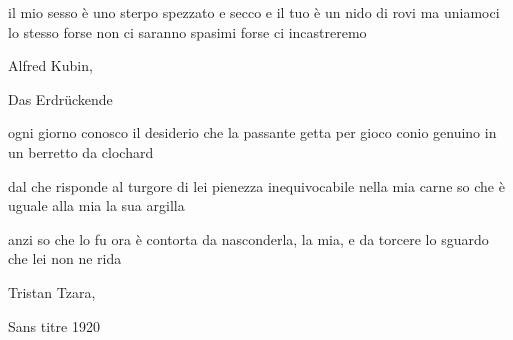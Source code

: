\begin{poem}
	\begin{stanza}
		il mio sesso è uno sterpo\verseline
		spezzato e secco\verseline
		e il tuo è un nido di rovi\verseline
		ma uniamoci lo stesso\verseline
		forse non ci saranno spasimi\verseline
		forse ci incastreremo
	\end{stanza}
\end{poem}

\clearpage


\begin{artItem}
	Alfred Kubin, \begin{otherlanguage}{german}%
		Das Erdrückende%
	\end{otherlanguage}
\end{artItem}

\begin{poem}
	\begin{stanza}
		ogni giorno conosco il desiderio\verseline
		che la passante getta per gioco\verseline
		conio genuino in un berretto da clochard
	\end{stanza}

	\begin{stanza}
		dal che risponde al turgore di lei\verseline
		pienezza inequivocabile nella mia carne\verseline
		so che è uguale alla mia la sua argilla
	\end{stanza}

	\begin{stanza}
		anzi\verseline
		so che lo fu\verseline
		ora \verseline
		è contorta da nasconderla, la mia,\verseline
		e da torcere lo sguardo che lei non ne rida
	\end{stanza}
\end{poem}

\clearpage


\begin{artItem}
	Tristan Tzara, \begin{otherlanguage}{french}%
		Sans titre 1920%
	\end{otherlanguage}
\end{artItem}

